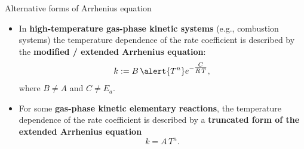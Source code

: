 \begin{frame}{Alternative forms of Arrhenius equation}
	\begin{itemize}
		\item In {\bf high-temperature gas-phase kinetic systems} (e.g., combustion systems) the temperature dependence of the rate coefficient is described by the 
		\alert{\bf modified / extended Arrhenius equation}:
		\[
		k := B\,\alert{T^n} e^{-\tfrac{C}{R\, T}},
		\]
		where $B \neq A$ and $C \neq E_a$.
		\item For some {\bf gas-phase kinetic elementary reactions}, the temperature dependence of 
		the rate coefficient is described by a 	\alert{\bf truncated form of the extended Arrhenius equation}
		\[
		k= A\,T^n.
		\]
	\end{itemize}

\end{frame}
%
%
